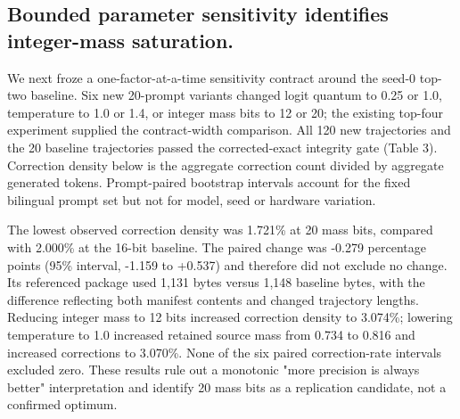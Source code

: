 \documentclass{nature}
\begin{document}
\subsection{Bounded parameter sensitivity identifies integer-mass saturation.}
We next froze a one-factor-at-a-time sensitivity contract around the seed-0 top-two baseline. Six new 20-prompt variants changed logit quantum to 0.25 or 1.0, temperature to 1.0 or 1.4, or integer mass bits to 12 or 20; the existing top-four experiment supplied the contract-width comparison. All 120 new trajectories and the 20 baseline trajectories passed the corrected-exact integrity gate (Table 3). Correction density below is the aggregate correction count divided by aggregate generated tokens. Prompt-paired bootstrap intervals account for the fixed bilingual prompt set but not for model, seed or hardware variation.

The lowest observed correction density was 1.721\% at 20 mass bits, compared with 2.000\% at the 16-bit baseline. The paired change was -0.279 percentage points (95\% interval, -1.159 to +0.537) and therefore did not exclude no change. Its referenced package used 1,131 bytes versus 1,148 baseline bytes, with the difference reflecting both manifest contents and changed trajectory lengths. Reducing integer mass to 12 bits increased correction density to 3.074\%; lowering temperature to 1.0 increased retained source mass from 0.734 to 0.816 and increased corrections to 3.070\%. None of the six paired correction-rate intervals excluded zero. These results rule out a monotonic "more precision is always better" interpretation and identify 20 mass bits as a replication candidate, not a confirmed optimum.
\end{document}
